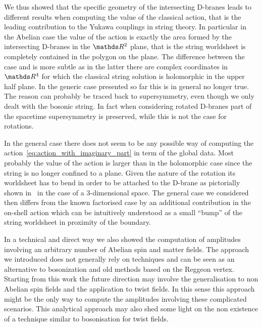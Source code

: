 We thus showed that the specific geometry of the intersecting D-branes leads to different results when computing the value of the classical action, that is the leading contribution to the Yukawa couplings in string theory.
In particular in the Abelian case the value of the action is exactly the area formed by the intersecting D-branes in the $\R^2$ plane, that is the string worldsheet is completely contained in the polygon on the plane.
The difference between the  case and  is more subtle as in the latter there are complex coordinates in $\R^4$ for which the classical string solution is holomorphic in the upper half plane.
In the generic case presented so far this is in general no longer true.
The reason can probably be traced back to supersymmetry, even though we only dealt with the bosonic string.
In fact when considering  rotated D-branes part of the spacetime supersymmetry is preserved, while this is not the case for  rotations.

In the general case there does not seem to be any possible way of computing the action~\eqref{eq:action_with_imaginary_part} in term of the global data.
Most probably the value of the action is larger than in the holomorphic case since the string is no longer confined to a plane.
Given the nature of the rotation its worldsheet has to bend in order to be attached to the D-brane as pictorially shown in~ in the case of a $3$-dimensional space.
The general case we considered then differs from the known factorised case by an additional contribution in the on-shell action which can be intuitively understood as a small ``bump'' of the string worldsheet in proximity of the boundary.

In a technical and direct way we also showed the computation of amplitudes involving an arbitrary number of Abelian spin and matter fields.
The approach we introduced does not generally rely on \cft techniques and can be seen as an alternative to bosonization and old methods based on the Reggeon vertex.
Starting from this work the future direction may involve the generalisation to non Abelian spin fields and the application to twist fields.
In this sense this approach might be the only way to compute the amplitudes involving these complicated scenarios.
This analytical approach may also shed some light on the non existence of a technique similar to bosonisation for twist fields.


